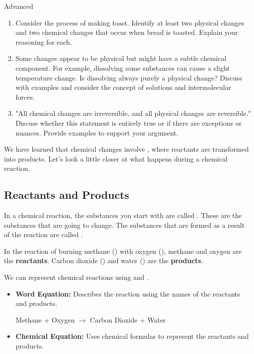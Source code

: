 \begin{tieredquestions}{Advanced}
\begin{enumerate}
    \item  Consider the process of making toast. Identify at least two physical changes and two chemical changes that occur when bread is toasted. Explain your reasoning for each.
    \item  Some changes appear to be physical but might have a subtle chemical component. For example, dissolving some substances can cause a slight temperature change.  Is dissolving always purely a physical change? Discuss with examples and consider the concept of solutions and intermolecular forces. 
    \item  "All chemical changes are irreversible, and all physical changes are reversible."  Discuss whether this statement is entirely true or if there are exceptions or nuances. Provide examples to support your argument.
\end{enumerate}
\end{tieredquestions}


\FloatBarrier
\1

We have learned that chemical changes involve , where reactants are transformed into products.  Let's look a little closer at what happens during a chemical reaction.

\subsection{Reactants and Products}

In a chemical reaction, the substances you start with are called . These are the substances that are going to change. The substances that are formed as a result of the reaction are called .

\begin{example}
In the reaction of burning methane () with oxygen (), methane and oxygen are the \textbf{reactants}. Carbon dioxide () and water () are the \textbf{products}.
\end{example}

We can represent chemical reactions using  and .

\begin{itemize}
    \item \textbf{Word Equation:} Describes the reaction using the names of the reactants and products.
    \begin{example}
    Methane + Oxygen $\rightarrow$ Carbon Dioxide + Water
    \end{example}
    \item \textbf{Chemical Equation:} Uses chemical formulas to represent the reactants and products.
    \begin{example}
    \end{example}
\end{itemize}


